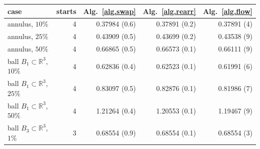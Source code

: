 \begin{tabular}{lrrrr}
\hline
case & starts & Alg.~\ref{alg.swap} & Alg.~\ref{alg.rearr} & Alg.~\ref{alg.flow}\\
\hline
annulus, $10\%$ & 4 & 0.37984 (0.6) & 0.37891 (0.2) & 0.37891 (4) \\
annulus, $25\%$ & 4 & 0.43909 (0.5) & 0.43699 (0.2) & 0.43538 (9) \\
annulus, $50\%$ & 4 & 0.66865 (0.5) & 0.66573 (0.1) & 0.66111 (9) \\
ball $B_1\subset\mathbb{R}^3$, $10\%$ & 4 & 0.62836 (0.4) & 0.62523 (0.1) & 0.61991 (6) \\
ball $B_1\subset\mathbb{R}^3$, $25\%$ & 4 & 0.83097 (0.5) & 0.82876 (0.1) & 0.81986 (7) \\
ball $B_1\subset\mathbb{R}^3$, $50\%$ & 4 & 1.21264 (0.4) & 1.20553 (0.1) & 1.19467 (9) \\
ball $B_3\subset\mathbb{R}^3$, $1\%$ & 3 & 0.68554 (0.9) & 0.68554 (0.1) & 0.68554 (3) \\
\hline
\end{tabular}
